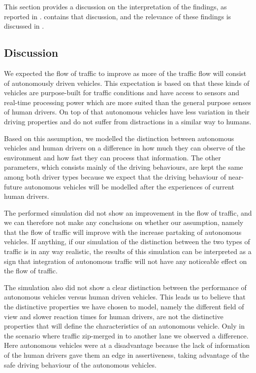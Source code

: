 
This section provides a discussion on the interpretation of the findings, as reported in .  contains that discussion, and the relevance of these findings is discussed in .

\subsection{Discussion}
\label{sub:conclusion:discussion}
We expected the flow of traffic to improve as more of the traffic flow will consist of autonomously driven vehicles. This expectation is based on that these kinds of vehicles are purpose-built for traffic conditions and have access to sensors and real-time processing power which are more suited than the general purpose senses of human drivers. On top of that autonomous vehicles have less variation in their driving properties and do not suffer from distractions in a similar way to humans.

Based on this assumption, we modelled the distinction between autonomous vehicles and human drivers on a difference in how much they can observe of the environment and how fast they can process that information. The other parameters, which consists mainly of the driving behaviours, are kept the same among both driver types because we expect that the driving behaviour of near-future autonomous vehicles will be modelled after the experiences of current human drivers.

The performed simulation did not show an improvement in the flow of traffic, and we can therefore not make any conclusions on whether our assumption, namely that the flow of traffic will improve with the increase partaking of autonomous vehicles. If anything, if our simulation of the distinction between the two types of traffic is in any way realistic, the results of this simulation can be interpreted as a sign that integration of autonomous traffic will not have any noticeable effect on the flow of traffic.

The simulation also did not show a clear distinction between the performance of autonomous vehicles versus human driven vehicles. This leads us to believe that the distinctive properties we have chosen to model, namely the different field of view and slower reaction times for human drivers, are not the distinctive properties that will define the characteristics of an autonomous vehicle. Only in the scenario where traffic zip-merged in to another lane we observed a difference. Here autonomous vehicles were at a disadvantage because the lack of information of the human drivers gave them an edge in assertiveness, taking advantage of the safe driving behaviour of the autonomous vehicles.

